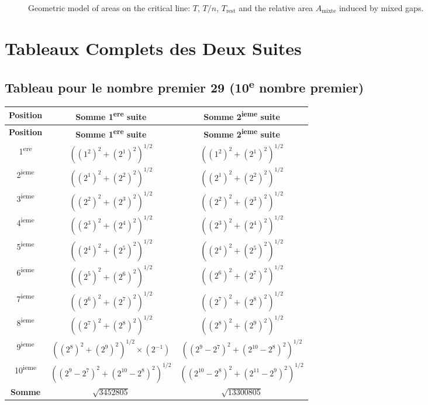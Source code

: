 \documentclass[a4paper,11pt]{article}
\begin{document}
\begin{figure}[h]
  \centering
  \caption{Geometric model of areas on the critical line: $T$, $T/n$,
  $T_{\text{rest}}$ and the relative area $A_{\text{mixte}}$ induced by
  mixed gaps.}
\end{figure}

\newpage
\section{Tableaux Complets des Deux Suites}

\subsection{Tableau pour le nombre premier 29 (10\textsuperscript{e} nombre premier)}

\begin{center}
\begin{longtable}{|c|c|c|}
\hline
\textbf{Position} & \textbf{Somme 1\textsuperscript{ere} suite} & \textbf{Somme 2\textsuperscript{ieme} suite} \\
\hline
\endfirsthead
\hline
\textbf{Position} & \textbf{Somme 1\textsuperscript{ere} suite} & \textbf{Somme 2\textsuperscript{ieme} suite} \\
\hline
\endhead
1\textsuperscript{ere} & $((1^2)^2 + (2^1)^2)^{1/2}$ & $((1^2)^2 + (2^1)^2)^{1/2}$ \\
\hline
2\textsuperscript{ieme} & $((2^1)^2 + (2^2)^2)^{1/2}$ & $((2^1)^2 + (2^2)^2)^{1/2}$ \\
\hline
3\textsuperscript{ieme} & $((2^2)^2 + (2^3)^2)^{1/2}$ & $((2^2)^2 + (2^3)^2)^{1/2}$ \\
\hline
4\textsuperscript{ieme} & $((2^3)^2 + (2^4)^2)^{1/2}$ & $((2^3)^2 + (2^4)^2)^{1/2}$ \\
\hline
5\textsuperscript{ieme} & $((2^4)^2 + (2^5)^2)^{1/2}$ & $((2^4)^2 + (2^5)^2)^{1/2}$ \\
\hline
6\textsuperscript{ieme} & $((2^5)^2 + (2^6)^2)^{1/2}$ & $((2^6)^2 + (2^7)^2)^{1/2}$ \\
\hline
7\textsuperscript{ieme} & $((2^6)^2 + (2^7)^2)^{1/2}$ & $((2^7)^2 + (2^8)^2)^{1/2}$ \\
\hline
8\textsuperscript{ieme} & $((2^7)^2 + (2^8)^2)^{1/2}$ & $((2^8)^2 + (2^9)^2)^{1/2}$ \\
\hline
9\textsuperscript{ieme} & $((2^8)^2 + (2^9)^2)^{1/2} \times (2^{-1})$ & $((2^9-2^7)^2 + (2^{10}-2^8)^2)^{1/2}$ \\
\hline
10\textsuperscript{ieme} & $((2^9-2^7)^2 + (2^{10}-2^8)^2)^{1/2}$ & $((2^{10}-2^8)^2 + (2^{11}-2^9)^2)^{1/2}$ \\
\hline
\textbf{Somme} & $\sqrt{3452805}$ & $\sqrt{13300805}$ \\
\hline
\end{longtable}
\end{center}
\end{document}
